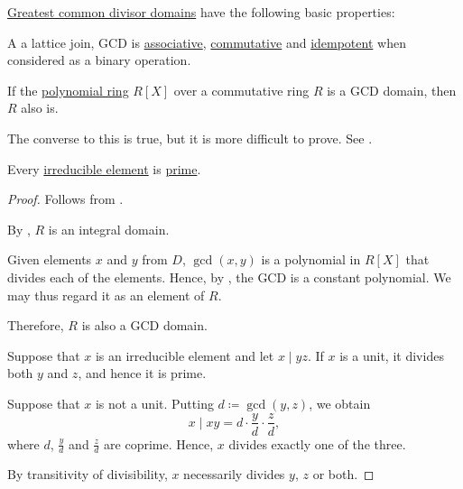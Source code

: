 \begin{proposition}\label{thm:def:gcd_domain}
  \hyperref[def:gcd_domain]{Greatest common divisor domains} have the following basic properties:
  \begin{thmenum}
     A a lattice join, GCD is \hyperref[def:binary_operation/associative]{associative}, \hyperref[def:binary_operation/commutative]{commutative} and \hyperref[def:binary_operation/idempotent]{idempotent} when considered as a binary operation.

     If the \hyperref[def:polynomial_algebra]{polynomial ring} \( R[X] \) over a commutative ring \( R \) is a GCD domain, then \( R \) also is.

    The converse to this is true, but it is more difficult to prove. See .

     Every \hyperref[def:domain_divisibility/irreducible]{irreducible element} is \hyperref[def:domain_divisibility/prime]{prime}.
  \end{thmenum}
\end{proposition}
\begin{proof}
   Follows from .

   By , \( R \) is an integral domain.

  Given elements \( x \) and \( y \) from \( D \), \( \gcd(x, y) \) is a polynomial in \( R[X] \) that divides each of the elements. Hence, by , the GCD is a constant polynomial. We may thus regard it as an element of \( R \).

  Therefore, \( R \) is also a GCD domain.

   Suppose that \( x \) is an irreducible element and let \( x \mid yz \). If \( x \) is a unit, it divides both \( y \) and \( z \), and hence it is prime.

  Suppose that \( x \) is not a unit. Putting \( d \coloneqq \gcd(y, z) \), we obtain
  \begin{equation*}
    x \mid x y = d \cdot \frac y d \cdot \frac z d,
  \end{equation*}
  where \( d \), \( \tfrac y d \) and \( \tfrac z d \) are coprime. Hence, \( x \) divides exactly one of the three.

  By transitivity of divisibility, \( x \) necessarily divides \( y \), \( z \) or both.
\end{proof}

